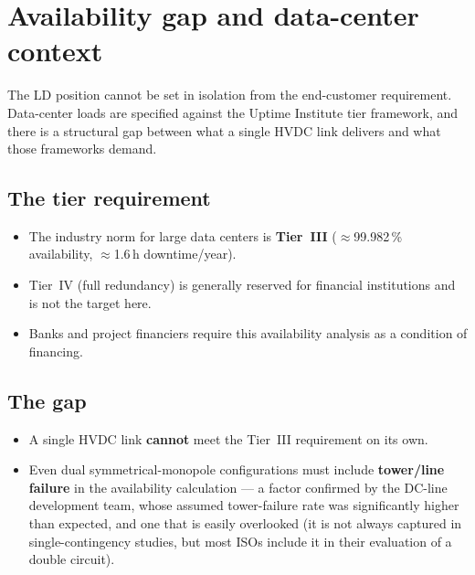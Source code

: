 \section{Availability gap and data-center context}

The LD position cannot be set in isolation from the end-customer requirement.
Data-center loads are specified against the Uptime Institute tier framework, and
there is a structural gap between what a single HVDC link delivers and what those
frameworks demand.

\subsection{The tier requirement}
\begin{itemize}\setlength{\itemsep}{0.25em}
  \item The industry norm for large data centers is \textbf{Tier~III}
        ($\approx$99.982\,\% availability, $\approx$1.6\,h downtime/year).
  \item Tier~IV (full redundancy) is generally reserved for financial
        institutions and is not the target here.
  \item Banks and project financiers require this availability analysis as a
        condition of financing.
\end{itemize}

\subsection{The gap}
\begin{itemize}\setlength{\itemsep}{0.25em}
  \item A single HVDC link \textbf{cannot} meet the Tier~III requirement on its
        own.
  \item Even dual symmetrical-monopole configurations must include
        \textbf{tower/line failure} in the availability calculation --- a factor
        confirmed by the DC-line development team, whose assumed tower-failure
        rate was significantly higher than expected, and one that is easily
        overlooked (it is not always captured in single-contingency studies, but
        most ISOs include it in their evaluation of a double circuit).
\end{itemize}

